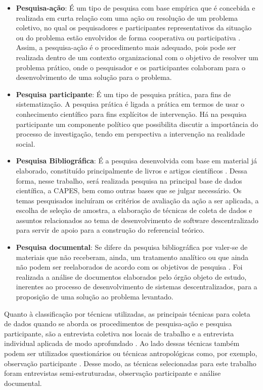 \begin{itemize}
	\item \textbf{Pesquisa-ação}: É um tipo de pesquisa com base empírica que é concebida e realizada em curta relação com uma ação ou resolução de um problema coletivo, no qual os pequisadores e participantes representativos da situação ou do problema estão envolvidos de forma cooperativa ou participativa \cite{thiollent2011metodologia}. Assim, a pesquisa-ação é o procedimento mais adequado, pois pode ser realizada dentro de um contexto organizacional com o objetivo de resolver um problema prático, onde o pesquisador e os participantes colaboram para o desenvolvimento de uma solução para o problema.
	\item \textbf{Pesquisa participante}: É um tipo de pesquisa prática, para fins de sistematização. A pesquisa prática é ligada a prática em termos de usar o conhecimento científico para fins explícitos de intervenção. Há na pesquisa participante um componente político que possibilita discutir a importância do processo de investigação, tendo em perspectiva a intervenção na realidade social.
	\item \textbf{Pesquisa Bibliográfica}: É a pesquisa desenvolvida com base em
	material já elaborado, constituído principalmente de livros e artigos científicos \cite{gil2002}. Dessa forma, nesse trabalho, será realizada pesquisa na principal base de dados científica, a CAPES, bem como outras bases que se julgar necessário. Os temas pesquisados incluíram os critérios de avaliação da ação a ser aplicada, a escolha de seleção de amostra, a elaboração de técnicas de coleta de dados e assuntos relacionados ao tema de desenvolvimento de software descentralizado para servir de apoio para a construção do referencial teórico.
	\item \textbf{Pesquisa documental}: Se difere da pesquisa bibliográfica por valer-se de materiais que não receberam, ainda, um tratamento analítico ou que ainda não podem ser reelaborados de acordo com os objetivos de pesquisa \cite{gil2002}. Foi realizada a análise de documentos elaborados pelo órgão objeto de estudo, inerentes ao processo de desenvolvimento de sistemas descentralizados, para a proposição de uma solução ao problema levantado.
\end{itemize}

Quanto à classificação por técnicas utilizadas, as principais técnicas para coleta de dados quando se aborda os procedimentos de pesquisa-ação e pesquisa participante, são a entrevista coletiva nos locais de trabalho e a entrevista individual aplicada de modo aprofundado \cite{thiollent2011metodologia}. Ao lado dessas técnicas também podem ser utilizados questionários ou técnicas antropológicas como, por exemplo, observação participante \cite{thiollent2011metodologia}. Desse modo, as técnicas selecionadas para este trabalho foram entrevistas semi-estruturadas, observação participante e análise documental.

